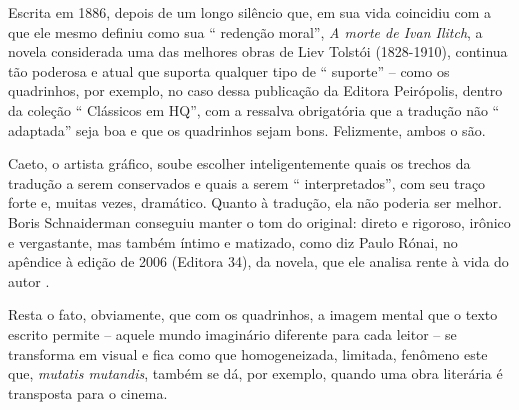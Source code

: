 Escrita em 1886, depois de um longo silêncio que, em sua vida coincidiu
com a que ele mesmo definiu como sua `` redenção moral'', \emph{A morte
de Ivan Ilitch}, a novela considerada uma das melhores obras de Liev
Tolstói (1828-1910), continua tão poderosa e atual que suporta qualquer
tipo de `` suporte'' -- como os quadrinhos, por exemplo, no caso dessa
publicação da Editora Peirópolis, dentro da coleção `` Clássicos em
HQ'', com a ressalva obrigatória que a tradução não `` adaptada'' seja
boa e que os quadrinhos sejam bons. Felizmente, ambos o são.

Caeto, o artista gráfico, soube escolher inteligentemente quais os
trechos da tradução a serem conservados e quais a serem ``
interpretados'', com seu traço forte e, muitas vezes, dramático. Quanto
à tradução, ela não poderia ser melhor. Boris Schnaiderman conseguiu
manter o tom do original: direto e rigoroso, irônico e vergastante, mas
também íntimo e matizado, como diz Paulo Rónai, no apêndice à edição de
2006 (Editora 34), da novela, que ele analisa rente à vida do autor .

Resta o fato, obviamente, que com os quadrinhos, a imagem mental que o
texto escrito permite -- aquele mundo imaginário diferente para cada
leitor -- se transforma em visual e fica como que homogeneizada,
limitada, fenômeno este que, \emph{mutatis mutandis}, também se dá, por
exemplo, quando uma obra literária é transposta para o cinema.


